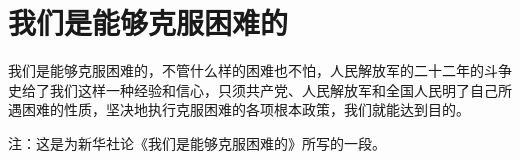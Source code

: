 \section[我们是能够克服困难的（一九四九年八月一日）]{我们是能够克服困难的}


我们是能够克服困难的，不管什么样的困难也不怕，人民解放军的二十二年的斗争史给了我们这样一种经验和信心，只须共产党、人民解放军和全国人民明了自己所遇困难的性质，坚决地执行克服困难的各项根本政策，我们就能达到目的。

注：这是为新华社论《我们是能够克服困难的》所写的一段。

